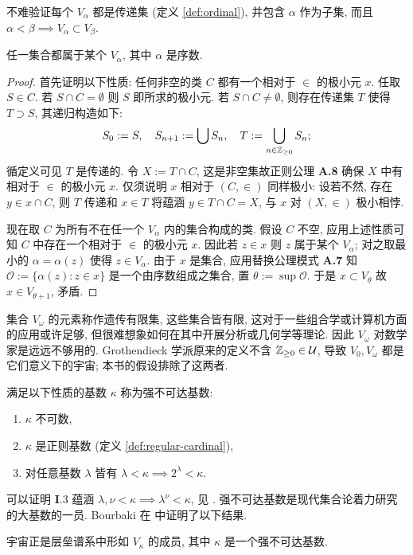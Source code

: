 不难验证每个 $V_\alpha$ 都是传递集 (定义 \ref{def:ordinal}), 并包含 $\alpha$ 作为子集, 而且 $\alpha < \beta \implies V_\alpha \subset V_\beta$.

\begin{proposition}
	任一集合都属于某个 $V_\alpha$, 其中 $\alpha$ 是序数.
\end{proposition}
\begin{proof}
	首先证明以下性质: 任何非空的类 $C$ 都有一个相对于 $\in$ 的极小元 $x$. 任取 $S \in C$. 若 $S \cap C = \emptyset$ 则 $S$ 即所求的极小元. 若 $S \cap C \neq \emptyset$, 则存在传递集 $T$ 使得 $T \supset S$, 其递归构造如下:
	\[ S_0 := S, \quad S_{n+1} := \bigcup S_n, \quad T := \bigcup_{n \in \mathbb{Z}_{\geq 0}} S_n; \]
	循定义可见 $T$ 是传递的. 令 $X := T \cap C$, 这是非空集故正则公理 \textbf{A.8} 确保 $X$ 中有相对于 $\in$ 的极小元 $x$. 仅须说明 $x$ 相对于 $(C, \in)$ 同样极小: 设若不然, 存在 $y \in x \cap C$, 则 $T$ 传递和 $x \in T$ 将蕴涵 $y \in T \cap C = X$, 与 $x$ 对 $(X, \in)$ 极小相悖.

	现在取 $C$ 为所有不在任一个 $V_\alpha$ 内的集合构成的类. 假设 $C$ 不空, 应用上述性质可知 $C$ 中存在一个相对于 $\in$ 的极小元 $x$. 因此若 $z \in x$ 则 $z$ 属于某个 $V_\alpha$; 对之取最小的 $\alpha = \alpha(z)$ 使得 $z \in V_\alpha$. 由于 $x$ 是集合, 应用替换公理模式 \textbf{A.7} 知 $\mathcal{O} := \{\alpha(z) : z \in x \}$ 是一个由序数组成之集合, 置 $\theta := \sup \mathcal{O}$. 于是 $x \subset V_\theta$ 故 $x \in V_{\theta+1}$, 矛盾.
\end{proof}

集合 $V_\omega$ 的元素称作遗传有限集, 这些集合皆有限, 这对于一些组合学或计算机方面的应用或许足够, 但很难想象如何在其中开展分析或几何学等理论. 因此 $V_\omega$ 对数学家是远远不够用的. Grothendieck 学派原来的定义不含 $\mathbb{Z}_{\geq 0} \in \mathcal{U}$, 导致 $V_0, V_\omega$ 都是它们意义下的宇宙; 本书的假设排除了这两者.

\begin{definition}
	满足以下性质的基数 $\kappa$ 称为强不可达基数:
	\begin{enumerate}[\bfseries {I}.1]
		\item $\kappa$ 不可数,
		\item $\kappa$ 是正则基数 (定义 \ref{def:regular-cardinal}),
		\item 对任意基数 $\lambda$ 皆有 $\lambda < \kappa \implies 2^\lambda < \kappa$.
	\end{enumerate}
\end{definition}
可以证明 \textbf{I}.3 蕴涵 $\lambda, \nu < \kappa \implies \lambda^\nu < \kappa$, 见 \cite[p.58]{Je03}. 强不可达基数是现代集合论着力研究的大基数的一员. Bourbaki 在 \cite[Exp. I, Appendice]{SGA4-1} 中证明了以下结果.
\begin{theorem}
	宇宙正是层垒谱系中形如 $V_\kappa$ 的成员, 其中 $\kappa$ 是一个强不可达基数.
\end{theorem}

